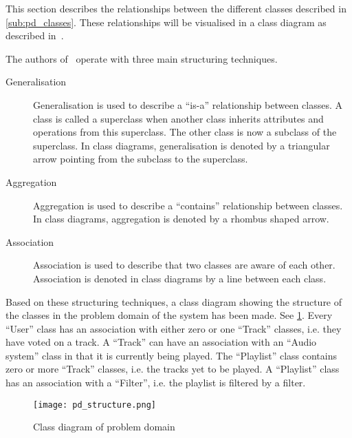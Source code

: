 This section describes the relationships between the different classes
described in \cref{sub:pd_classes}. These relationships will be
visualised in a class diagram as described
in~\cite{mathiassen2001objektorienteret}.

The authors of~\cite{mathiassen2001objektorienteret} operate with three
main structuring techniques.

\begin{description}
\item[Generalisation] Generalisation is used to describe a \enquote{is-a}
  relationship between classes. A class is called a
  superclass when another class inherits attributes and operations
  from this superclass. The other class is now a subclass of the
  superclass. In class diagrams, generalisation is denoted by a
  triangular arrow pointing from the subclass to the superclass.
\item[Aggregation] Aggregation is used to describe a
  \enquote{contains} relationship between classes. In class diagrams,
  aggregation is denoted by a rhombus shaped arrow.
\item[Association] Association is used to describe that two classes
  are aware of each other. Association is denoted in class diagrams by
  a line between each class.
\end{description} 

Based on these structuring techniques, a class diagram showing the structure of the classes in the problem domain of the system has been made. See \cref{fig:pd_structure}. Every \enquote{User} class has an association with either zero or one \enquote{Track} classes, i.e. they have voted on a track. A \enquote{Track} can have an association with an \enquote{Audio system} class in that it is currently being played. The \enquote{Playlist} class contains zero or more \enquote{Track} classes, i.e. the tracks yet to be played. A \enquote{Playlist} class has an association with a \enquote{Filter}, i.e. the playlist is filtered by a filter.

\begin{figure}
  \centering
  \texttt{[image: pd\_structure.png]}
  \caption{Class diagram of problem domain}\label{fig:pd_structure}
\end{figure}
